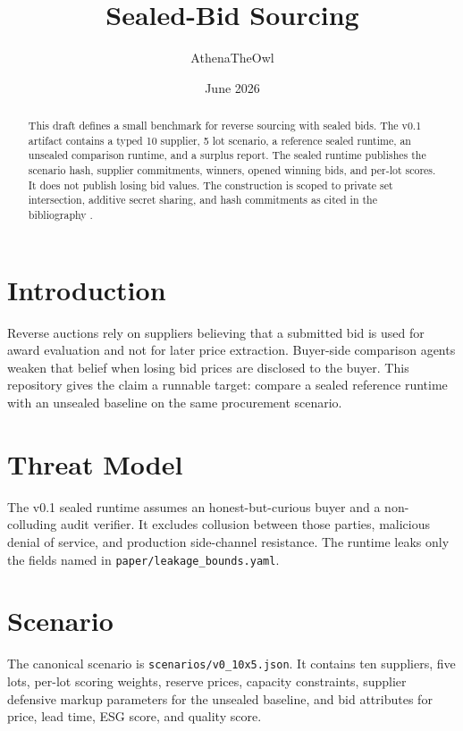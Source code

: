 \documentclass[11pt]{article}
\title{Sealed-Bid Sourcing}
\author{AthenaTheOwl}
\date{June 2026}
\begin{document}
\maketitle

\begin{abstract}
This draft defines a small benchmark for reverse sourcing with sealed bids.
The v0.1 artifact contains a typed 10 supplier, 5 lot scenario, a reference
sealed runtime, an unsealed comparison runtime, and a surplus report. The
sealed runtime publishes the scenario hash, supplier commitments, winners,
opened winning bids, and per-lot scores. It does not publish losing bid
values. The construction is scoped to private set intersection, additive
secret sharing, and hash commitments as cited in the bibliography
\cite{sciencedirect2026psi,freedman2004private,decristofaro2010practical,shamir1979share,beaver1991efficient}.
\end{abstract}

\section{Introduction}

Reverse auctions rely on suppliers believing that a submitted bid is used for
award evaluation and not for later price extraction. Buyer-side comparison
agents weaken that belief when losing bid prices are disclosed to the buyer.
This repository gives the claim a runnable target: compare a sealed reference
runtime with an unsealed baseline on the same procurement scenario.

\section{Threat Model}

The v0.1 sealed runtime assumes an honest-but-curious buyer and a
non-colluding audit verifier. It excludes collusion between those parties,
malicious denial of service, and production side-channel resistance. The
runtime leaks only the fields named in \texttt{paper/leakage\_bounds.yaml}.

\section{Scenario}

The canonical scenario is \texttt{scenarios/v0\_10x5.json}. It contains ten
suppliers, five lots, per-lot scoring weights, reserve prices, capacity
constraints, supplier defensive markup parameters for the unsealed baseline,
and bid attributes for price, lead time, ESG score, and quality score.
\end{document}
